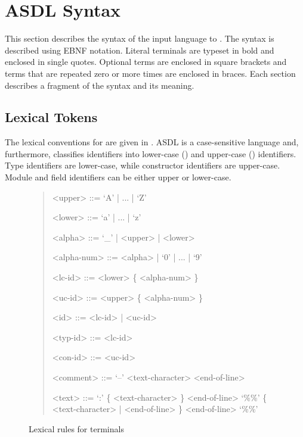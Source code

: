 %
\chapter{ASDL Syntax}
\label{chap:syntax}

This section describes the syntax of the input language to \asdlgen{}.
The syntax is described using EBNF notation.
Literal terminals are typeset in bold and enclosed in single quotes.
Optional terms are enclosed in square brackets and terms that are
repeated zero or more times are enclosed in braces.
Each section describes a fragment of the syntax and its meaning.

\section{Lexical Tokens}

The lexical conventions for \asdl{} are given in .
ASDL is a case-sensitive language and, furthermore, classifies identifiers
into lower-case () and upper-case () identifiers.
Type identifiers are lower-case, while constructor identifiers are upper-case.
Module and field identifiers can be either upper or lower-case.

\begin{figure}[t]
  \begin{quote}
    \begin{grammar}
      <upper>     ::= `A' | ... | `Z'

      <lower>     ::= `a' | ... | `z'

      <alpha>     ::= `_' | <upper> | <lower>

      <alpha-num> ::= <alpha> | `0' | ... | `9'

      <lc-id>     ::= <lower> \{ <alpha-num> \}
      
      <uc-id>     ::= <upper> \{ <alpha-num> \}

      <id>        ::= <lc-id> | <uc-id>
                  
      <typ-id>    ::= <lc-id>

      <con-id>    ::= <uc-id>

      <comment>   ::= `--' <text-character> <end-of-line>

      <text>      ::= `:' \{ <text-character> \} <end-of-line>
               \alt{} `\%\%' \{ <text-character> | <end-of-line> \} <end-of-line> `\%\%'
    \end{grammar}
  \end{quote}
  \caption{Lexical rules for \asdl{} terminals}
  \label{fig:lexical-syntax}
\end{figure}%


